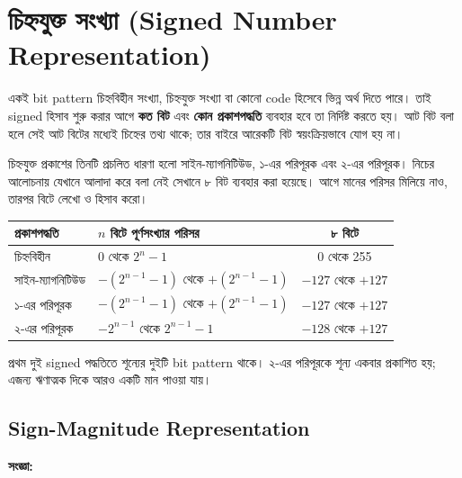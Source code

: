 
\section{চিহ্নযুক্ত সংখ্যা
(\textenglish{Signed Number Representation})}

একই bit pattern চিহ্নবিহীন সংখ্যা, চিহ্নযুক্ত সংখ্যা বা কোনো code হিসেবে ভিন্ন অর্থ দিতে পারে। তাই signed হিসাব শুরু করার আগে \textbf{কত বিট} এবং \textbf{কোন প্রকাশপদ্ধতি} ব্যবহার হবে তা নির্দিষ্ট করতে হয়। আট বিট বলা হলে সেই আট বিটের মধ্যেই চিহ্নের তথ্য থাকে; তার বাইরে আরেকটি বিট স্বয়ংক্রিয়ভাবে যোগ হয় না।

চিহ্নযুক্ত প্রকাশের তিনটি প্রচলিত ধারণা হলো সাইন-ম্যাগনিটিউড, ১-এর পরিপূরক এবং ২-এর পরিপূরক। নিচের আলোচনায় যেখানে আলাদা করে বলা নেই সেখানে ৮ বিট ব্যবহার করা হয়েছে। আগে মানের পরিসর মিলিয়ে নাও, তারপর বিটে লেখো ও হিসাব করো।
\begin{center}\begin{tabularx}{\linewidth}{|L{.25\linewidth}|Y|c|}\hline
{}প্রকাশপদ্ধতি&$n$ বিটে পূর্ণসংখ্যার পরিসর&৮ বিটে\\\hline
চিহ্নবিহীন&$0$ থেকে $2^n-1$&0 থেকে 255\\\hline
সাইন-ম্যাগনিটিউড&$-(2^{n-1}-1)$ থেকে $+(2^{n-1}-1)$&$-127$ থেকে $+127$\\\hline
১-এর পরিপূরক&$-(2^{n-1}-1)$ থেকে $+(2^{n-1}-1)$&$-127$ থেকে $+127$\\\hline
২-এর পরিপূরক&$-2^{n-1}$ থেকে $2^{n-1}-1$&$-128$ থেকে $+127$\\\hline
\end{tabularx}\end{center}
প্রথম দুই signed পদ্ধতিতে শূন্যের দুইটি bit pattern থাকে। ২-এর পরিপূরকে শূন্য একবার প্রকাশিত হয়; এজন্য ঋণাত্মক দিকে আরও একটি মান পাওয়া যায়।


\subsection{\textenglish{Sign-Magnitude Representation}}

\par\begingroup

\textbf{সংজ্ঞা:}

